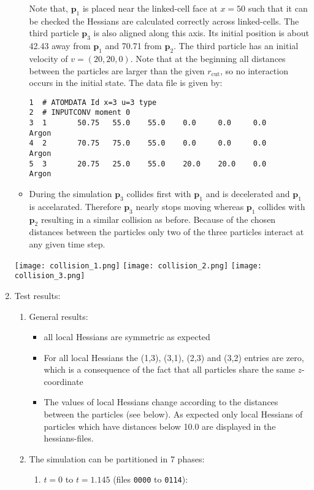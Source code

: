 \documentclass[a4paper]{article}
\newcommand{\boldp}{\boldsymbol{p}}
\begin{document}
\begin{enumerate}
\begin{itemize}
Note that, \(\boldp_1\) is placed near the linked-cell face at \(x = 50\) such that it can be checked the Hessians are calculated correctly across linked-cells.
The third particle \(\boldp_3\) is also aligned along this axis. Its initial position is about 42.43 away from \(\boldp_1\)  and 70.71 from \(\boldp_2\).
The third particle has an initial velocity of \(v = (20, 20, 0)\).
Note that at the beginning all distances between the particles are larger than the given \(r_{\textrm{cut}}\), so no interaction occurs in the initial state.
The data file is given by:
\begin{verbatim}
1  # ATOMDATA Id x=3 u=3 type
2  # INPUTCONV moment 0
3  1       50.75   55.0    55.0    0.0     0.0     0.0     Argon
4  2       70.75   75.0    55.0    0.0     0.0     0.0     Argon
5  3       20.75   25.0    55.0    20.0    20.0    0.0     Argon
\end{verbatim}
\item During the simulation \(\boldp_3\) collides first with \(\boldp_1\) and is decelerated and \(\boldp_1\) is accelarated.
Therefore \(\boldp_3\) nearly stops moving whereas \(\boldp_1\) collides with \(\boldp_2\) resulting in a similar collision as before.
Because of the chosen distances between the particles only two of the three particles interact at any given time step.
\end{itemize}
\texttt{[image: collision\_1.png]}
\texttt{[image: collision\_2.png]}
\texttt{[image: collision\_3.png]}
\item Test results:
\label{sec-1-5-2-3}
\begin{enumerate}
\item General results:
\begin{itemize}
\item all local Hessians are symmetric as expected
\item For all local Hessians the (1,3), (3,1), (2,3) and (3,2) entries are zero, which is a consequence of the fact that all particles share the same \(z\)-coordinate
\item The values of local Hessians change according to the distances between the particles (see below).
As expected only local Hessians of particles which have distances below 10.0 are displayed in the hessians-files.
\end{itemize}
\item The simulation can be partitioned in 7 phases:
\begin{enumerate}
\item \(t=0\) to \(t=1.145\) (files \texttt{0000} to \texttt{0114}):

\end{enumerate}
\end{enumerate}
\end{enumerate}
\end{document}
